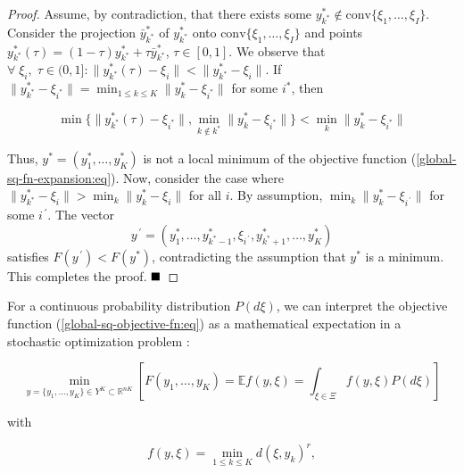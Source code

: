 \begin{proof}
    Assume, by contradiction, that there exists some $y_{k^{*}}^{*} \notin \text{conv}\{\xi_1, \ldots, \xi_I\}$. Consider the projection $\bar{y}_{k^{*}}^{*}$ of $y_{k^{*}}^{*}$ onto $\text{conv}\{\xi_1, \ldots, \xi_I\}$ and points $y_{k^{*}}^{*}(\tau) = (1 - \tau)y_{k^{*}}^{*} + \tau\bar{y}_{k^{*}}^{*}$, $\tau \in [0, 1]$. We observe that $\forall\; \xi_i,\; \tau \in (0, 1]: \|y_{k^{*}}^{*}(\tau) - \xi_i\| < \|y_{k^{*}}^{*} - \xi_i\|$. If $\|y_{k^{*}}^{*} - \xi_{i^{*}}\| = \min_{1 \leq k \leq K} \|y_k^{*} - \xi_{i^{*}}\|$ for some $i^{*}$, then

    \begin{equation}
        \min\{\| y_{k^{*}}^{*}(\tau) - \xi_{i^{*}} \|, \min_{k \notin k^{*}} \| y_k^{*} - \xi_{i^{*}} \|\} < \min_k \| y_k^{*} - \xi_{i^{*}} \|
    \end{equation}

    \noindent Thus, $y^{*} = (y_1^{*}, \ldots, y_K^{*})$ is not a local minimum of the objective function (\ref{global-sq-fn-expansion:eq}). Now, consider the case where $ \| y_{k^{*}}^{*} - \xi_i \| > \min_k \| y_k^{*} - \xi_i \|$ for all $i$. By assumption, $\min_k \| y_k^{*} - \xi_{i^{\,\prime}} \|$ for some $i ^{\,\prime}$. The vector $$y^{\,\prime} = (y_1^{*}, \ldots, y_{k^{*} - 1}^{*}, \xi_{i ^{\,\prime}}, y_{k^{*} + 1}^{*}, \ldots, y_K^{*})$$ satisfies $F(y^{\,\prime}) < F(y^{*})$, contradicting the assumption that $y^{*}$ is a minimum. This completes the proof. $ \qed $
\end{proof}

For a continuous probability distribution $P(d\xi)$, we can interpret the objective function (\ref{global-sq-objective-fn:eq}) as a mathematical expectation in a stochastic optimization problem \cite{ermoliev1976stochastic,Newton_Yousefian_Pasupathy_2018,Norkin_Kozyriev_Norkin_2024}:

\begin{equation}
    \label{smooth-stoch-opt-problem:eq}
        \min_{y = \{ y_1, \ldots, y_K \} \in Y^K \subset \mathbb{R}^{nK}} 
				\left[F(y_1, \ldots, y_K) = \mathbb{E} f(y, \xi) = \int_{\xi \in \Xi} f(y, \xi) P(d \xi)\right]
\end{equation}

\noindent with 

\begin{equation}
    \label{smooth-stoch-fn-expansion:eq}
        f(y, \xi) =  \min_{1 \leq k \leq K} d(\xi, y_k)^r, 
\end{equation}

